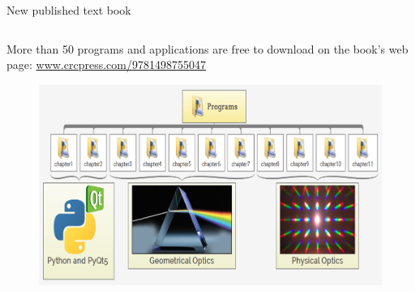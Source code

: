 \documentclass[9pt]{beamer}
\begin{document}
\begin{frame}{New published text book}
\begin{columns}[c]
	\begin{column}{0.6\textwidth}
		More than 50 programs and applications are free to download on the book's web page: \url{www.crcpress.com/9781498755047}
		
		\begin{figure}
			\includegraphics[width=\linewidth]{images/Image4}
			
		\end{figure}
		

\end{column}
\end{columns}
\end{frame}
\end{document}
